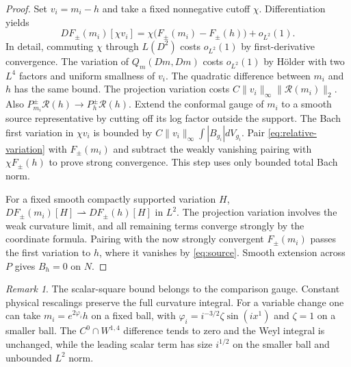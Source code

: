 \documentclass[11pt]{article}
\theoremstyle{definition}
\theoremstyle{remark}
\newtheorem{remark}[theorem]{Remark}
\begin{document}
\begin{proof}
Set \(v_i=m_i-h\) and take a fixed nonnegative cutoff \(\chi\). Differentiation yields
\begin{equation}\label{eq:relative-variation}
 DF_\pm(m_i)[\chi v_i]
     =\chi\big(F_\pm(m_i)-F_\pm(h)\big)+o_{L^2}(1).
\end{equation}
In detail, commuting \(\chi\) through \(L(D^2)\) costs \(o_{L^2}(1)\) by first-derivative convergence. The variation of \(Q_m(Dm,Dm)\) costs \(o_{L^2}(1)\) by H\"older with two \(L^4\) factors and uniform smallness of \(v_i\). The quadratic difference between \(m_i\) and \(h\) has the same bound. The projection variation costs \(C\|v_i\|_\infty\|\mathcal R(m_i)\|_2\). Also \(P^\pm_{m_i}\mathcal R(h)\to P^\pm_h\mathcal R(h)\). Extend the conformal gauge of \(m_i\) to a smooth source representative by cutting off its log factor outside the support. The Bach first variation in \(\chi v_i\) is bounded by \(C\|v_i\|_\infty\int|B_{g_i}|dV_{g_i}\). Pair \eqref{eq:relative-variation} with \(F_\pm(m_i)\) and subtract the weakly vanishing pairing with \(\chi F_\pm(h)\) to prove strong convergence. This step uses only bounded total Bach norm.

For a fixed smooth compactly supported variation \(H\), \(DF_\pm(m_i)[H]\rightharpoonup DF_\pm(h)[H]\) in \(L^2\). The projection variation involves the weak curvature limit, and all remaining terms converge strongly by the coordinate formula. Pairing with the now strongly convergent \(F_\pm(m_i)\) passes the first variation to \(h\), where it vanishes by \eqref{eq:source}. Smooth extension across \(P\) gives \(B_h=0\) on \(N\).
\end{proof}

\begin{remark}
The scalar-square bound belongs to the comparison gauge. Constant physical rescalings preserve the full curvature integral. For a variable change one can take \(m_i=e^{2\varphi_i}h\) on a fixed ball, with \(\varphi_i=i^{-3/2}\zeta\sin(ix^1)\) and \(\zeta=1\) on a smaller ball. The \(C^0\cap W^{1,4}\) difference tends to zero and the Weyl integral is unchanged, while the leading scalar term has size \(i^{1/2}\) on the smaller ball and unbounded \(L^2\) norm.
\end{remark}
\end{document}
